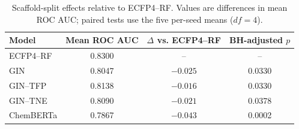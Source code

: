 \begin{table}[t]
\centering
\caption{Scaffold-split effects relative to ECFP4--RF. Values are differences in mean ROC AUC; paired tests use the five per-seed means ($df=4$).}
\label{tab:effect_summary}
\begin{tabular}{lccc}
\toprule
Model & Mean ROC AUC & $\Delta$ vs. ECFP4--RF & BH-adjusted $p$ \\
\midrule
ECFP4--RF & \num{0.8300} & {--} & {--} \\
GIN & \num{0.8047} & $-\num{0.025}$ & \num{0.0330} \\
GIN--TFP & \num{0.8138} & $-\num{0.016}$ & \num{0.0330} \\
GIN--TNE & \num{0.8090} & $-\num{0.021}$ & \num{0.0378} \\
ChemBERTa & \num{0.7867} & $-\num{0.043}$ & \num{0.0002} \\
\bottomrule
\end{tabular}
\end{table}
